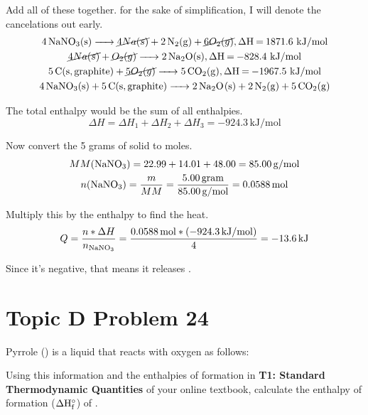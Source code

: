 \documentclass[10pt]{article}
\begin{document}
            Add all of these together. for the sake of simplification, I will denote the cancelations out early.
            \begin{gather}
                \ce{4NaNO3(s) -> \cancel{4Na(s)} + 2N2(g) + \cancel{6O_2(g)}, \Delta H = 1871.6\,\unit{\kilo\joule/\mole}}\\
                \ce{\cancel{4Na(s)} + \cancel{O_2(g)} -> 2Na2O(s), \Delta H = -828.4\,\unit{\kilo\joule/\mole}}\\
                \ce{5C(s, graphite) + \cancel{5O_2(g)} -> 5CO2(g), \Delta H = -1967.5\,\unit{\kilo\joule/\mole}}\\
                \ce{4 NaNO3(s) + 5 C(s, graphite) -> 2 Na2O(s) + 2 N2(g) + 5 CO2(g)}
            \end{gather}

            The total enthalpy would be the sum of all enthalpies.
            \begin{equation}
                \Delta H = \Delta H_1 + \Delta H_2 + \Delta H_3 = -924.3\,\unit{\kilo\joule/\mole}
            \end{equation}

            Now convert the 5 grams of solid  to moles. 
            \begin{gather}
                MM(\ce{NaNO3})  =   22.99 + 14.01 + 48.00
                    =   85.00\,\unit{\gram/\mole}\\
                n(\ce{NaNO3})   =   \frac{m}{MM}
                    =   \frac{5.00\,\unit{gram}}{85.00\,\unit{\gram/\mole}}
                    =   0.0588\,\unit{\mole}
            \end{gather}

            Multiply this by the enthalpy to find the heat.
            \begin{align}
                Q   =   \frac{n * \Delta H}{n_{\ce{NaNO3}}}
                    =   \frac{0.0588\,\unit{\mole} * (-924.3\,\unit{\kilo\joule/\mole})}{4}
                    =   -13.6\,\unit{\kilo\joule}
            \end{align}

            Since it's negative, that means it releases . 

    \pagebreak
    \section{Topic D Problem 24}
        Pyrrole () is a liquid that reacts with oxygen as follows:
        \begin{center}
        \end{center} 
        Using this information and the enthalpies of formation in \textbf{T1: Standard Thermodynamic Quantities} of your online textbook, calculate the enthalpy of formation ($\rm \Delta H_f^{\circ}$) of .
\end{document}
